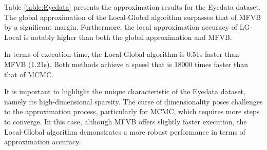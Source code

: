 Table \ref{table:Eyedata} presents the approximation results for the Eyedata dataset. The global approximation of the Local-Global algorithm surpasses that of MFVB by a significant margin. Furthermore, the local approximation accuracy of LG-Local is notably higher than both the global approximation and MFVB.

In terms of execution time, the Local-Global algorithm is 0.51s faster than MFVB (1.21s). Both methods achieve a speed that is 18000 times faster than that of MCMC.

It is important to highlight the unique characteristic of the Eyedata dataset, namely its high-dimensional sparsity. The curse of dimensionality poses challenges to the approximation process, particularly for MCMC, which requires more steps to converge. In this case, although MFVB offers slightly faster execution, the Local-Global algorithm demonstrates a more robust performance in terms of approximation accuracy.







